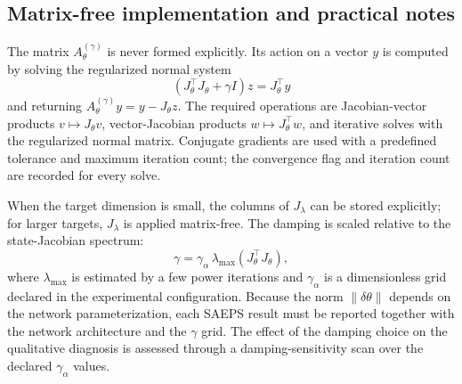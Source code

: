 \documentclass[preprint,12pt]{elsarticle}
\begin{document}
\subsection{Matrix-free implementation and practical notes}

The matrix $A_\theta^{(\gamma)}$ is never formed explicitly.  Its action on a vector $y$ is computed by solving the regularized normal system
\begin{equation}
    (J_\theta^\top J_\theta+\gamma I)z = J_\theta^\top y
    \label{eq:normal_system}
\end{equation}
and returning $A_\theta^{(\gamma)}y = y - J_\theta z$.  The required operations are Jacobian-vector products $v\mapsto J_\theta v$, vector-Jacobian products $w\mapsto J_\theta^\top w$, and iterative solves with the regularized normal matrix.  Conjugate gradients are used with a predefined tolerance and maximum iteration count; the convergence flag and iteration count are recorded for every solve.

When the target dimension is small, the columns of $J_\lambda$ can be stored explicitly; for larger targets, $J_\lambda$ is applied matrix-free.  The damping is scaled relative to the state-Jacobian spectrum:
\begin{equation}
    \gamma = \gamma_\alpha\,\lambda_{\max}(J_\theta^\top J_\theta),
    \label{eq:relative_gamma}
\end{equation}
where $\lambda_{\max}$ is estimated by a few power iterations and $\gamma_\alpha$ is a dimensionless grid declared in the experimental configuration.  Because the norm $\|\delta\theta\|$ depends on the network parameterization, each SAEPS result must be reported together with the network architecture and the $\gamma$ grid.  The effect of the damping choice on the qualitative diagnosis is assessed through a damping-sensitivity scan over the declared $\gamma_\alpha$ values.
\end{document}
